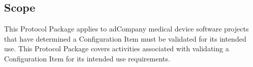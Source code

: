 \subsection{Scope}
This Protocol Package applies to adCompany medical device software projects that
have determined a Configuration Item must be validated for its intended use.
This Protocol Package covers activities associated with validating a
Configuration Item for its intended use requirements.

